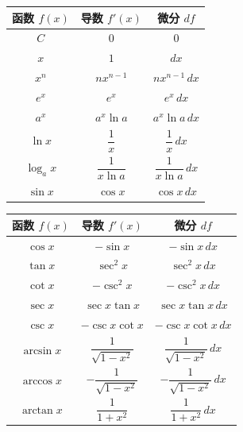 \documentclass[cn,toc=twocol]{elegantbook}
\begin{document}
\begin{center}
  \renewcommand{\arraystretch}{1.4}
  \begin{minipage}[t]{0.49\textwidth}
    \centering
    \begin{tabular}{ccc}
      \toprule
      函数 $f(x)$ & 导数 $f'(x)$ & 微分 $df$ \\
      \midrule
      $C$  		  & $0$                 & $0$ \\
      $x$         & $1$                 & $dx$ \\
      $x^n$       & $n x^{n-1}$         & $n x^{n-1}\,dx$ \\
      $e^x$       & $e^x$               & $e^x\,dx$ \\
      $a^x$       & $a^x\ln a$          & $a^x\ln a\,dx$ \\
      $\ln x$     & $\dfrac{1}{x}$      & $\dfrac{1}{x}\,dx$ \\
      $\log_a x$  & $\dfrac{1}{x\ln a}$ & $\dfrac{1}{x\ln a}\,dx$ \\
      $\sin x$    & $\cos x$            & $\cos x\,dx$ \\
      \bottomrule
    \end{tabular}
  \end{minipage}\hfill
  \begin{minipage}[t]{0.49\textwidth}
    \centering
    \begin{tabular}{ccc}
      \toprule
      函数 $f(x)$ & 导数 $f'(x)$ & 微分 $df$ \\
      \midrule
      $\cos x$    & $-\sin x$           & $-\sin x\,dx$ \\
      $\tan x$    & $\sec^2 x$          & $\sec^2 x\,dx$ \\
      $\cot x$    & $-\csc^2 x$         & $-\csc^2 x\,dx$ \\
      $\sec x$    & $\sec x\tan x$      & $\sec x\tan x\,dx$ \\
      $\csc x$    & $-\csc x\cot x$     & $-\csc x\cot x\,dx$ \\
      $\arcsin x$ & $\dfrac{1}{\sqrt{1-x^2}}$  & $\dfrac{1}{\sqrt{1-x^2}}\,dx$ \\
      $\arccos x$ & $-\dfrac{1}{\sqrt{1-x^2}}$ & $-\dfrac{1}{\sqrt{1-x^2}}\,dx$ \\
      $\arctan x$ & $\dfrac{1}{1+x^2}$  & $\dfrac{1}{1+x^2}\,dx$ \\
      \bottomrule
    \end{tabular}
  \end{minipage}
  \vspace{0.4em}
\end{center}
\end{document}

